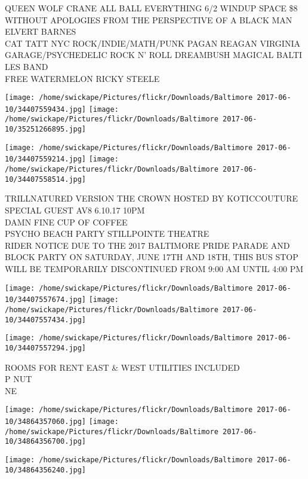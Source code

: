\documentclass[10pt,letterpaper]{article}
\begin{document}
QUEEN WOLF CRANE ALL BALL EVERYTHING 6/2 WINDUP SPACE \$8\\
WITHOUT APOLOGIES FROM THE PERSPECTIVE OF A BLACK MAN ELVERT BARNES\\
CAT TATT NYC ROCK/INDIE/MATH/PUNK PAGAN REAGAN VIRGINIA GARAGE/PSYCHEDELIC ROCK N' ROLL DREAMBUSH MAGICAL BALTI LES BAND\\
FREE WATERMELON RICKY STEELE
\pagebreak

\texttt{[image: /home/swickape/Pictures/flickr/Downloads/Baltimore 2017-06-10/34407559434.jpg]}
\texttt{[image: /home/swickape/Pictures/flickr/Downloads/Baltimore 2017-06-10/35251266895.jpg]}

\texttt{[image: /home/swickape/Pictures/flickr/Downloads/Baltimore 2017-06-10/34407559214.jpg]}
\texttt{[image: /home/swickape/Pictures/flickr/Downloads/Baltimore 2017-06-10/34407558514.jpg]}

TRILLNATURED VERSION THE CROWN HOSTED BY KOTICCOUTURE SPECIAL GUEST AV8 6.10.17 10PM\\
DAMN FINE CUP OF COFFEE\\
PSYCHO BEACH PARTY STILLPOINTE THEATRE\\
RIDER NOTICE DUE TO THE 2017 BALTIMORE PRIDE PARADE AND BLOCK PARTY ON SATURDAY, JUNE 17TH AND 18TH, THIS BUS STOP WILL BE TEMPORARILY DISCONTINUED FROM 9:00 AM UNTIL 4:00 PM
\pagebreak

\texttt{[image: /home/swickape/Pictures/flickr/Downloads/Baltimore 2017-06-10/34407557674.jpg]}
\texttt{[image: /home/swickape/Pictures/flickr/Downloads/Baltimore 2017-06-10/34407557434.jpg]}

\vspace{0.25in}
\texttt{[image: /home/swickape/Pictures/flickr/Downloads/Baltimore 2017-06-10/34407557294.jpg]}

ROOMS FOR RENT EAST \& WEST UTILITIES INCLUDED\\
P NUT\\
NE
\pagebreak

\texttt{[image: /home/swickape/Pictures/flickr/Downloads/Baltimore 2017-06-10/34864357060.jpg]}
\texttt{[image: /home/swickape/Pictures/flickr/Downloads/Baltimore 2017-06-10/34864356700.jpg]}

\vspace{0.25in}
\texttt{[image: /home/swickape/Pictures/flickr/Downloads/Baltimore 2017-06-10/34864356240.jpg]}
\end{document}
